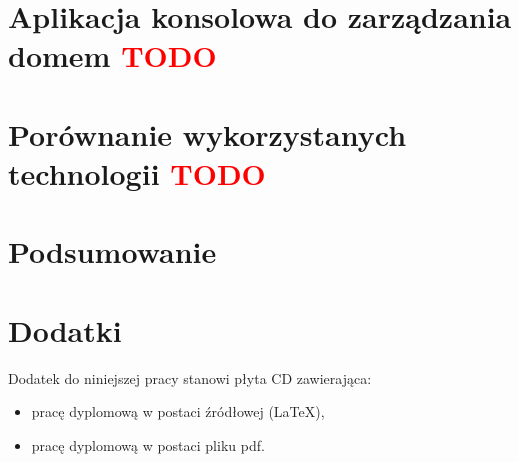 \documentclass[11pt, a4paper,polish,twoside]{report}
\begin{document}
\chapter{Aplikacja konsolowa do zarządzania domem \textcolor{red}{TODO}} \label{aplikacja_zarzadzanie}


\chapter{Porównanie wykorzystanych technologii \textcolor{red}{TODO}}



\chapter{Podsumowanie}



%

\nocite{*}
\printbibliography 


\chapter*{Dodatki}
Dodatek do niniejszej pracy stanowi płyta CD zawierająca:
\begin{itemize}
\item pracę dyplomową w postaci źródłowej (LaTeX),
\item pracę dyplomową w postaci pliku pdf.
\end{itemize}

\newpage
{}	
\listoffigures

\newpage
{}	
\listoftables

\end{document}
